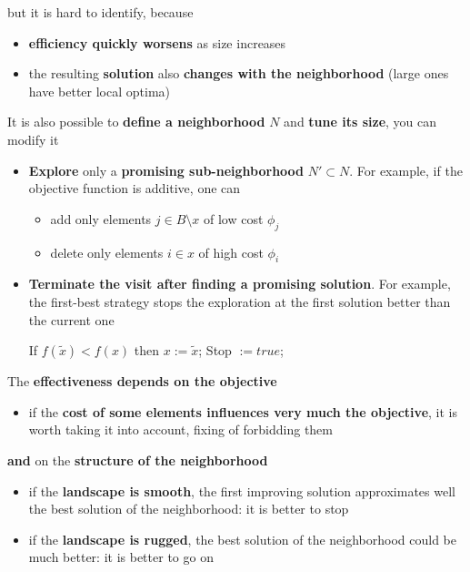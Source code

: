 but it is hard to identify, because
\begin{itemize}
	\item \textbf{efficiency quickly worsens} as size increases
	\item the resulting \textbf{solution} also \textbf{changes with the neighborhood} (large ones have better local optima)
\end{itemize}

\newpage

It is also possible to \textbf{define a neighborhood} $N$ and \textbf{tune its size}, you can modify it
\begin{itemize}
	\item \textbf{Explore} only a \textbf{promising sub-neighborhood} $N' \subset N$. For example, if the objective function is additive, one can
	\begin{itemize}
		\item add only elements $j \in B \setminus x$ of low cost $\phi_j$
		\item delete only elements $i \in x$ of high cost $\phi_i$
	\end{itemize}
	\nn
	
	\item \textbf{Terminate the visit after finding a promising solution}. For example, the first-best strategy stops the exploration at the first solution better than the current one
	\begin{center}
		If $f (\tilde{x}) < f (x)$ then $x := \tilde{x}$; Stop $:= true$;
	\end{center}
	\nn
\end{itemize}

The \textbf{effectiveness depends on the objective}
\begin{itemize}
	\item if the \textbf{cost of some elements influences very much the objective}, it is worth taking it into account, fixing of forbidding them
\end{itemize}

\textbf{and} on the \textbf{structure of the neighborhood}
\begin{itemize}
	\item if the \textbf{landscape is smooth}, the first improving solution approximates well the best solution of the neighborhood: it is better to stop
	
	\item if the \textbf{landscape is rugged}, the best solution of the neighborhood could be much better: it is better to go on
\end{itemize}

